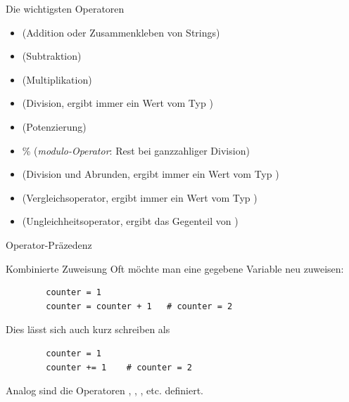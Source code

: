 \begin{frame}
\begin{block}{Die wichtigsten Operatoren}
	\begin{itemize}
		\item \pybw{+} (Addition oder Zusammenkleben von Strings)
		\item \pybw{-} (Subtraktion)
		\item \pybw{*} (Multiplikation)
		\item \pybw{/} (Division, ergibt immer ein Wert vom Typ )
		\item \pybw{**} (Potenzierung)
			\item \% (\textit{modulo-Operator}: Rest bei ganzzahliger Division)
		\item \pybw{//} (Division und Abrunden, ergibt immer ein Wert vom Typ )
		\item \pybw{==} (Vergleichsoperator, ergibt immer ein Wert vom Typ )
		\item \pybw{!=} (Ungleichheitsoperator, ergibt das Gegenteil von \pybw{==})
	\end{itemize}
\end{block}
\end{frame}

\begin{frame}
\begin{block}{Operator-Präzedenz}
	\uncover<+->{
	\begin{enumerate}[<+->]
		\item Klammern
		\item \pybw{**}
		\item \pybw{*}, \pybw{/}, \pybw{//}, \%
		\item \pybw{+},\pybw{-}
	\end{enumerate}	
	}

\end{block}
\end{frame}

\begin{fragile}[]
\begin{block}{Kombinierte Zuweisung}
		\vspace{2pt}
		Oft möchte man eine gegebene Variable neu zuweisen: 
		\begin{verbatim}
		counter = 1
		counter = counter + 1 	# counter = 2
		\end{verbatim}
		\pause
		Dies lässt sich auch kurz schreiben als 
		\begin{verbatim}
		counter = 1
		counter += 1 	# counter = 2
		\end{verbatim}
		\pause
		Analog sind die Operatoren \py{-=}, \py{*=}, \py{/=}, etc. definiert. 
	\end{block}
\end{fragile}



